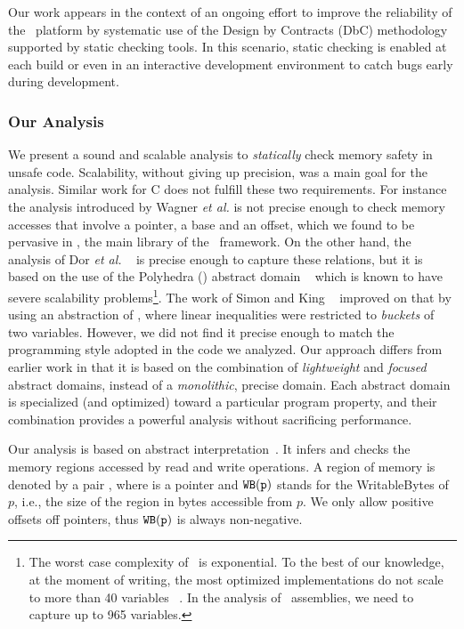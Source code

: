 \documentclass[10pt]{sigplanconf}
\begin{document}
Our work appears in the context of an ongoing effort to improve the
reliability of the \NET\ platform by systematic use of the Design
by Contracts (DbC) methodology~\cite{meyer97} supported by static
checking tools.  In this scenario, static checking is enabled at each
build or even in an interactive development environment to catch bugs early during development.

\subsubsection*{Our Analysis} 
We present a sound and scalable analysis to \emph{statically} check
memory safety in unsafe code.  Scalability, without giving up precision,
was a main goal for the analysis.  Similar work for C does not fulfill
these two requirements.  For instance the analysis introduced by
Wagner \emph{et al.} \cite{Wagner00} is not precise enough to check
memory accesses that involve a pointer, a base and an offset, which we
found to be pervasive in , the main library of the
\NET\ framework.  On the other hand, the analysis of Dor \emph{et al.}
~\cite{Dor03,Dor01} is precise enough to capture these relations, but
it is based on the use of the Polyhedra (\Polyhedra) abstract domain
~\cite{CousotHalbwachs78} which is known to have severe scalability
problems\footnote{The worst case complexity of \Polyhedra\ is
exponential. To the best of our knowledge, at the moment of writing,
the most optimized implementations do not scale to more than 40
variables ~\cite{PPL,Boogie}.  In the analysis of \NET\ assemblies, we
need to capture up to 965 variables.}.  The work of Simon and King
~\cite{SimonKing02-1,SimonKing02-2} improved on that by using an
abstraction of \Polyhedra, where linear inequalities were restricted
to \emph{buckets} of two variables.  However, we did not find it
precise enough to match the programming style adopted in the code we
analyzed.  Our approach differs from earlier
work in that it is based on the combination of \emph{lightweight}
and \emph{focused} abstract domains, instead of a \emph{monolithic}, precise domain.
Each abstract domain is specialized (and optimized) toward a
particular program property, and their combination provides a powerful
analysis without sacrificing performance.


Our analysis is based on abstract interpretation~\cite{CousotCousot77}.
It infers and checks the memory regions accessed by read and write operations.
A region of memory is denoted by a pair , where
 is a pointer and $\mathtt{WB}(\mathtt{p})$ stands for the WritableBytes of
$p$, i.e., the size of the region in bytes accessible from $p$. We only allow
positive offsets off pointers, thus $\mathtt{WB}(\mathtt{p})$ is always non-negative.
\end{document}
